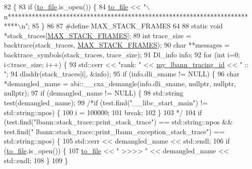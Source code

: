 \begin{DoxyCode}
82                          \{
83   \textcolor{keywordflow}{if} (\hyperlink{namespacelbann_1_1stack__trace_a6c838c74fec7cc57e5ccad283a8d282b}{to\_file}.is\_open()) \{
84     \hyperlink{namespacelbann_1_1stack__trace_a6c838c74fec7cc57e5ccad283a8d282b}{to\_file} << \textcolor{stringliteral}{"\(\backslash\)n**************************************************************************\(\backslash\)n"};
85   \}
86 
87 \textcolor{preprocessor}{  #define MAX\_STACK\_FRAMES 64}
88   \textcolor{keyword}{static} \textcolor{keywordtype}{void} *stack\_traces[\hyperlink{stack__trace_8cpp_a2ed127ee3fe422f95420f138273e6da7}{MAX\_STACK\_FRAMES}];
89   \textcolor{keywordtype}{int} trace\_size = backtrace(stack\_traces, \hyperlink{stack__trace_8cpp_a2ed127ee3fe422f95420f138273e6da7}{MAX\_STACK\_FRAMES});
90   \textcolor{keywordtype}{char} **messages = backtrace\_symbols(stack\_traces, trace\_size);
91   Dl\_info info;
92   \textcolor{keywordflow}{for} (\textcolor{keywordtype}{int} i=0; i<trace\_size; i++) \{
93     std::cerr << \textcolor{stringliteral}{"rank: "} << \hyperlink{namespacelbann_1_1stack__trace_a78efe186260936105751e65f56c381d7}{my\_lbann\_tracing\_id} << \textcolor{stringliteral}{" :: "};
94     dladdr(stack\_traces[i], &info);
95     \textcolor{keywordflow}{if} (info.dli\_sname != NULL) \{
96       \textcolor{keywordtype}{char} *demangled\_name = abi::\_\_cxa\_demangle(info.dli\_sname, \textcolor{keyword}{nullptr}, \textcolor{keyword}{nullptr}, \textcolor{keyword}{nullptr});
97       \textcolor{keywordflow}{if} (demangled\_name != NULL) \{
98         std::string test(demangled\_name);
99         \textcolor{comment}{/*if (test.find("\_\_libc\_start\_main") != std::string::npos) \{}
100 \textcolor{comment}{          i = 100000;}
101 \textcolor{comment}{          break;}
102 \textcolor{comment}{        \}}
103 \textcolor{comment}{        */}
104         \textcolor{keywordflow}{if} (test.find(\textcolor{stringliteral}{"lbann::stack\_trace::print\_stack\_trace"}) == std::string::npos && test.find(\textcolor{stringliteral}{"
      lbann::stack\_trace::print\_lbann\_exception\_stack\_trace"}) == std::string::npos) \{
105           std::cerr << demangled\_name << std::endl;
106           \textcolor{keywordflow}{if} (\hyperlink{namespacelbann_1_1stack__trace_a6c838c74fec7cc57e5ccad283a8d282b}{to\_file}.is\_open()) \{
107             \hyperlink{namespacelbann_1_1stack__trace_a6c838c74fec7cc57e5ccad283a8d282b}{to\_file} << \textcolor{stringliteral}{"  >>>> "} << demangled\_name << std::endl;
108           \}
109         \}

\end{DoxyCode}
